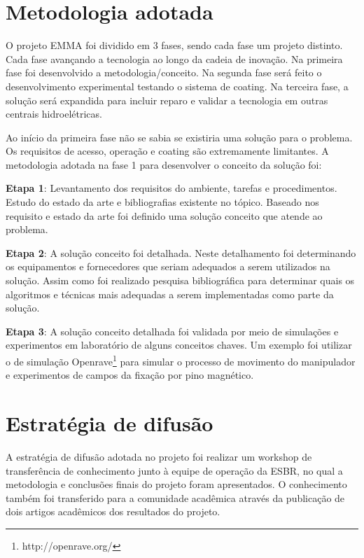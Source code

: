 \section{Metodologia adotada}

O projeto EMMA foi dividido em 3 fases, sendo cada fase um projeto distinto.
Cada fase avançando a tecnologia ao longo da cadeia de inovação. Na primeira
fase foi desenvolvido a metodologia/conceito. Na segunda fase será feito o
desenvolvimento experimental testando o sistema de coating. Na terceira fase, a
solução será expandida para incluir reparo e validar a tecnologia em
outras centrais hidroelétricas.

Ao início da primeira fase não se sabia se existiria uma solução para o
problema. Os requisitos de acesso, operação e coating são extremamente
limitantes. A metodologia adotada na fase 1 para desenvolver o conceito da
solução foi:

\textbf{Etapa 1}: Levantamento dos requisitos do ambiente, tarefas e
procedimentos.
Estudo do estado da arte e bibliografias existente no tópico. Baseado nos
requisito e estado da arte foi definido uma solução conceito que atende ao problema.

\textbf{Etapa 2}: A solução conceito foi detalhada. Neste detalhamento foi
determinando os equipamentos e fornecedores que seriam adequados a serem
utilizados na solução. Assim como foi realizado pesquisa bibliográfica para
determinar quais os algoritmos e técnicas mais adequadas a serem implementadas
como parte da solução.

\textbf{Etapa 3}:  A solução conceito detalhada foi validada por meio de
simulações e experi\-mentos em laboratório de alguns conceitos chaves. Um
exemplo foi utilizar o  de simulação
Openrave\footnote{http://openrave.org/} para simular o processo de movimento do manipulador e experimentos de campos da fixação por pino magnético.

\section{Estratégia de difusão}

A estratégia de difusão adotada no projeto foi realizar um workshop de
transferência de conhecimento junto à equipe de operação da ESBR, no qual a
metodologia e conclusões finais do projeto foram apresentados. O conhecimento
também foi transferido para a comunidade acadêmica através da publicação de
dois artigos acadêmicos dos resultados do projeto.

